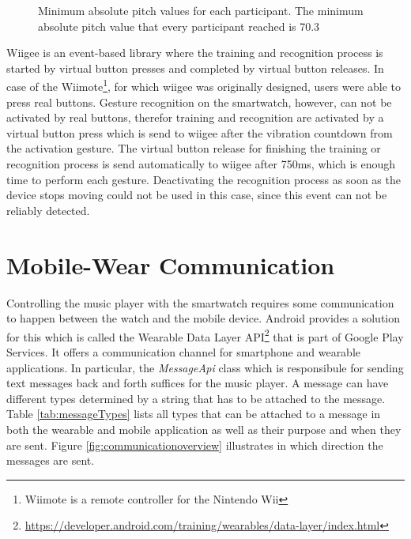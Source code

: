 \begin{figure}
	\myfloatalign
	\caption{Minimum absolute pitch values for each participant. The minimum absolute pitch value that every participant reached is 70.3}
	\label{fig:pitchPlot}
\end{figure}

Wiigee is an event-based library where the training and recognition process is started by virtual button presses and completed by virtual button releases. In case of the Wiimote\footnote{Wiimote is a remote controller for the Nintendo Wii}, for which wiigee was originally designed, users were able to press real buttons. Gesture recognition on the smartwatch, however, can not be activated by real buttons, therefor training and recognition are activated by a virtual button press which is send to wiigee after the vibration countdown from the activation gesture. The virtual button release for finishing the training or recognition process is send automatically to wiigee after 750ms, which is enough time to perform each gesture. Deactivating the recognition process as soon as the device stops moving could not be used in this case, since this event can not be reliably detected.
\newpage
\section{Mobile-Wear Communication}\label{sec:Communication}
Controlling the music player with the smartwatch requires some communication to happen between the watch and the mobile device. Android provides a solution for this which is called the Wearable Data Layer \ac{API}\footnote{\url{https://developer.android.com/training/wearables/data-layer/index.html}} that is part of Google Play Services. It offers a communication channel for smartphone and wearable applications. In particular, the \textit{MessageApi} class which is responsibule for sending text messages back and forth suffices for the music player. A message can have different types determined by a string that has to be attached to the message. Table \ref{tab:messageTypes} lists all types that can be attached to a message in both the wearable and mobile application as well as their purpose and when they are sent. Figure \ref{fig:communicationoverview} illustrates in which direction the messages are sent.

